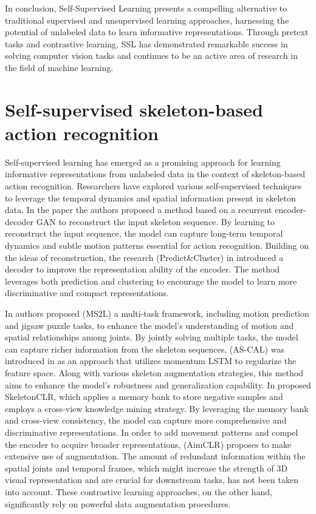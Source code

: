 In conclusion, Self-Supervised Learning presents a compelling alternative to traditional supervised and unsupervised learning approaches, harnessing the potential of unlabeled data to learn informative representations. Through pretext tasks and contrastive learning, SSL has demonstrated remarkable success in solving computer vision tasks and continues to be an active area of research in the field of machine learning.



\section{Self-supervised skeleton-based action recognition}
Self-supervised learning has emerged as a promising approach for learning informative representations from unlabeled data in the context of skeleton-based action recognition. Researchers have explored various self-supervised techniques to leverage the temporal dynamics and spatial information present in skeleton data. In the paper \cite{zheng2018unsupervised} the authors proposed a method based on a recurrent encoder-decoder GAN to reconstruct the input skeleton sequence. By learning to reconstruct the input sequence, the model can capture long-term temporal dynamics and subtle motion patterns essential for action recognition. Building on the ideas of reconstruction, the research (Predict\&Cluster) in \cite{su2020predict} introduced a decoder to improve the representation ability of the encoder. The method leverages both prediction and clustering to encourage the model to learn more discriminative and compact representations.

In \cite{lin2020ms2l} authors proposed (MS2L) a multi-task framework, including motion prediction and jigsaw puzzle tasks, to enhance the model's understanding of motion and spatial relationships among joints. By jointly solving multiple tasks, the model can capture richer information from the skeleton sequences. (AS-CAL) was introduced in \cite{rao2021augmented} as an approach that utilizes momentum LSTM to regularize the feature space. Along with various skeleton augmentation strategies, this method aims to enhance the model's robustness and generalization capability. In \cite{li20213d} proposed SkeletonCLR, which applies a memory bank to store negative samples and employs a cross-view knowledge mining strategy. By leveraging the memory bank and cross-view consistency, the model can capture more comprehensive and discriminative representations. In order to add movement patterns and compel the encoder to acquire broader representations, (AimCLR)  proposes to make extensive use of augmentation.  The amount of redundant information within the spatial joints and temporal frames, which might increase the strength of 3D visual representation and are crucial for downstream tasks, has not been taken into account. These contrastive learning approaches, on the other hand, significantly rely on powerful data augmentation procedures.

